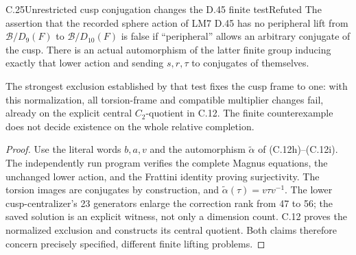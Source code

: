 \begin{statement}{C.25}{Unrestricted cusp conjugation changes the D.45 finite test}{Refuted}
The assertion that the recorded sphere action of LM7 D.45
has no peripheral lift from
\(\mathcal B/D_9(F)\) to \(\mathcal B/D_{10}(F)\)
is false if ``peripheral'' allows an arbitrary conjugate
of the cusp. There is an actual automorphism of the latter
finite group inducing exactly that lower action and sending
\(s,r,\tau\) to conjugates of themselves.

The strongest exclusion established by that test fixes
the cusp frame to one: with this normalization, all
torsion-frame and compatible multiplier changes fail,
already on the explicit central \(C_2\)-quotient in
C.12. The finite counterexample does not decide
existence on the whole relative completion.
\end{statement}
\begin{proof}
Use the literal words \(b,a,v\) and the automorphism
\(\widetilde\alpha\) of (C.12h)--(C.12i).
The independently run program
 verifies the complete
Magnus equations, the unchanged lower action, and the
Frattini identity proving surjectivity. The torsion
images are conjugates by construction, and
\(\widetilde\alpha(\tau)=v\tau v^{-1}\).
The lower cusp-centralizer's 23 generators enlarge
the correction rank from 47 to 56; the saved solution
is an explicit witness, not only a dimension count.
C.12 proves the normalized exclusion and constructs
its central quotient. Both claims therefore concern
precisely specified, different finite lifting problems.
\end{proof}

